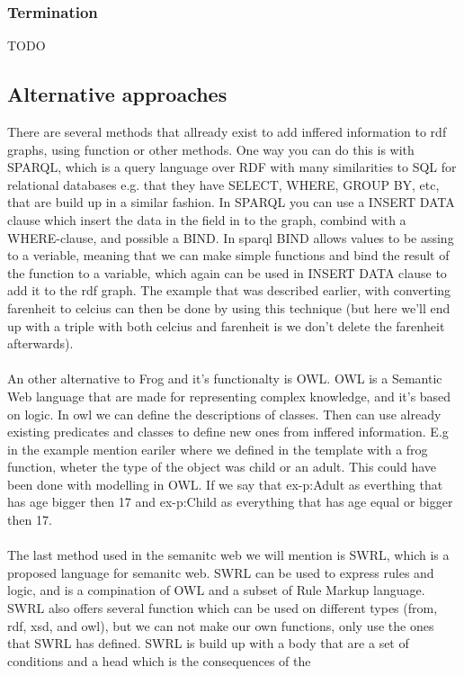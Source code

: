 \subsubsection{Termination}
TODO


\subsection{Alternative approaches}
There are several methods that allready exist to add inffered information to rdf graphs, using function or other methods. 
One way you can do this is with SPARQL, which is a query language over RDF with many similarities to SQL for relational 
databases e.g. that they have SELECT, WHERE, GROUP BY, etc, that are build up in a similar fashion. In SPARQL you can use 
a INSERT DATA clause which insert the data in the field in to the graph, combind with a WHERE-clause, and possible a BIND. 
In sparql BIND allows values to be assing to a veriable, meaning that we can make simple functions and bind the result of 
the function to a variable, which again can be used in INSERT DATA clause to add it to the rdf graph. The example that was
described earlier, with converting farenheit to celcius can then be done by using this technique (but here we'll end up with a 
triple with both celcius and farenheit is we don't delete the farenheit afterwards). 
\\ \\
An other alternative to Frog and it's functionalty is OWL. OWL is a Semantic Web language that are made for representing complex 
knowledge, and it's based on logic. In owl we can define the descriptions of classes. Then can use already existing 
predicates and classes to define new ones from inffered information. E.g in the example mention eariler where we defined in the template
with a frog function, wheter the type of the object was child or an adult. This could have been done with modelling in OWL. If we say that  
ex-p:Adult as everthing that has age bigger then 17 and ex-p:Child as everything that has age equal or bigger then 17.
\\ \\
The last method used in the semanitc web we will mention is SWRL, which is a proposed language for semanitc web. SWRL can be used 
to express rules and logic, and is a compination of OWL and a subset of Rule Markup language. SWRL also offers several function 
which can be used on different types (from, rdf, xsd, and owl), but we can not make our own functions, only use the ones that 
SWRL has defined. SWRL is build up with a body that are a set of conditions and a head which is the consequences of the
